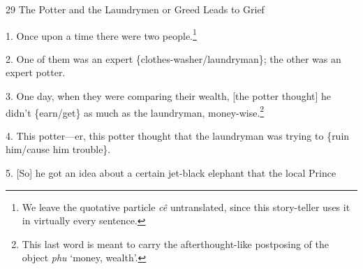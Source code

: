 
29 The Potter and the Laundrymen or Greed Leads to Grief

1. Once upon a time there were two people.\footnote{We leave the quotative particle \textit{cê} untranslated, since this story-teller uses it in virtually every sentence.}

2. One of them was an expert \{clothes-washer/laundryman\}; the other was an expert
potter.

3. One day, when they were comparing their wealth, [the potter thought] he didn't
\{earn/get\} as much as the laundryman, money-wise.\footnote{This last word is meant to carry the afterthought-like postposing of the object \textit{phu} `money, wealth'.}

4. This potter---er, this potter thought that the laundryman was trying to \{ruin
him/cause him trouble\}.

5. [So] he got an idea about a certain jet-black elephant that the local Prince
